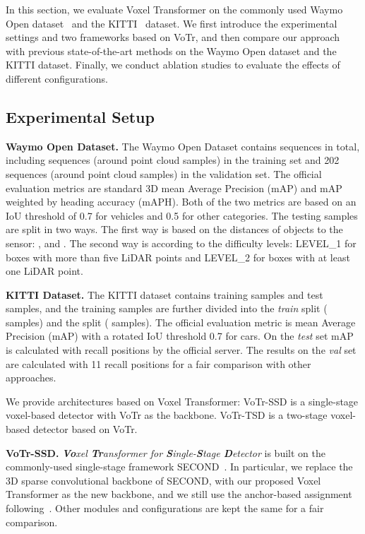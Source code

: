 \documentclass[10pt,twocolumn,letterpaper]{article}
\begin{document}
In this section, we evaluate Voxel Transformer on the commonly used Waymo Open dataset~\cite{sun2020scalability} and the KITTI~\cite{geiger2013vision} dataset. We first introduce the experimental settings and two frameworks based on VoTr, and then compare our approach with previous state-of-the-art methods on the Waymo Open dataset and the KITTI dataset. Finally, we conduct ablation studies to evaluate the effects of different configurations.

\subsection{Experimental Setup} \label{Experimental Setup}
\noindent\textbf{Waymo Open Dataset.} The Waymo Open Dataset contains  sequences in total, including  sequences (around  point cloud samples) in the training set and 202 sequences (around  point cloud samples) in the validation set. The official evaluation metrics are standard 3D mean Average Precision (mAP) and mAP weighted by heading accuracy (mAPH). Both of the two metrics are based on an IoU threshold of 0.7 for vehicles and 0.5 for other categories. The testing samples are split in two ways. The first way is based on the distances of objects to the sensor: ,  and . The second way is according to the difficulty levels: LEVEL\_1 for boxes with more than five LiDAR points and LEVEL\_2 for boxes with at least one LiDAR point.

\noindent\textbf{KITTI Dataset.} The KITTI dataset contains  training samples and  test samples, and the training samples are further divided into the \textit{train} split ( samples) and the  split ( samples). The official evaluation metric is mean Average Precision (mAP) with a rotated IoU threshold 0.7 for cars. On the \textit{test} set mAP is calculated with  recall positions by the official server. The results on the \textit{val} set are calculated with 11 recall positions for a fair comparison with other approaches.

We provide  architectures based on Voxel Transformer: VoTr-SSD is a single-stage voxel-based detector with VoTr as the backbone. VoTr-TSD is a two-stage voxel-based detector based on VoTr.

\noindent\textbf{VoTr-SSD.} \textit{\textbf{Vo}xel \textbf{Tr}ansformer for \textbf{S}ingle-\textbf{S}tage \textbf{D}etector} is built on the commonly-used single-stage framework SECOND~\cite{yan2018second}. In particular, we replace the 3D sparse convolutional backbone of SECOND, with our proposed Voxel Transformer as the new backbone, and we still use the anchor-based assignment following~\cite{yan2018second}. Other modules and configurations are kept the same for a fair comparison.
\end{document}
